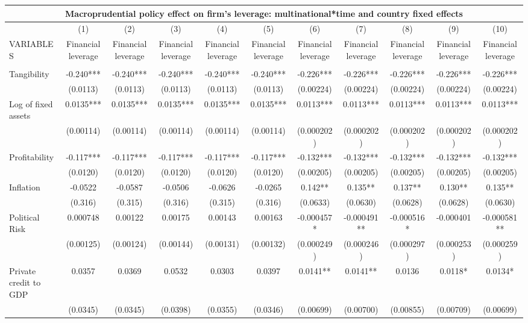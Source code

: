 \begin{tabular}{lcccccccccc}
\multicolumn{11}{c}{Macroprudential policy effect on firm's leverage: multinational*time and country fixed effects} \\ \hline
 & (1) & (2) & (3) & (4) & (5) & (6) & (7) & (8) & (9) & (10) \\
VARIABLES & Financial leverage & Financial leverage & Financial leverage & Financial leverage & Financial leverage & Financial leverage & Financial leverage & Financial leverage & Financial leverage & Financial leverage \\ \hline
 &  &  &  &  &  &  &  &  &  &  \\
Tangibility & -0.240*** & -0.240*** & -0.240*** & -0.240*** & -0.240*** & -0.226*** & -0.226*** & -0.226*** & -0.226*** & -0.226*** \\
 & (0.0113) & (0.0113) & (0.0113) & (0.0113) & (0.0113) & (0.00224) & (0.00224) & (0.00224) & (0.00224) & (0.00224) \\
Log of fixed assets & 0.0135*** & 0.0135*** & 0.0135*** & 0.0135*** & 0.0135*** & 0.0113*** & 0.0113*** & 0.0113*** & 0.0113*** & 0.0113*** \\
 & (0.00114) & (0.00114) & (0.00114) & (0.00114) & (0.00114) & (0.000202) & (0.000202) & (0.000202) & (0.000202) & (0.000202) \\
Profitability & -0.117*** & -0.117*** & -0.117*** & -0.117*** & -0.117*** & -0.132*** & -0.132*** & -0.132*** & -0.132*** & -0.132*** \\
 & (0.0120) & (0.0120) & (0.0120) & (0.0120) & (0.0120) & (0.00205) & (0.00205) & (0.00205) & (0.00205) & (0.00205) \\
Inflation & -0.0522 & -0.0587 & -0.0506 & -0.0626 & -0.0265 & 0.142** & 0.135** & 0.137** & 0.130** & 0.135** \\
 & (0.316) & (0.315) & (0.316) & (0.315) & (0.316) & (0.0633) & (0.0630) & (0.0628) & (0.0628) & (0.0630) \\
Political Risk & 0.000748 & 0.00122 & 0.00175 & 0.00143 & 0.00163 & -0.000457* & -0.000491** & -0.000516* & -0.000401 & -0.000581** \\
 & (0.00125) & (0.00124) & (0.00144) & (0.00131) & (0.00132) & (0.000249) & (0.000246) & (0.000297) & (0.000253) & (0.000259) \\
Private credit to GDP & 0.0357 & 0.0369 & 0.0532 & 0.0303 & 0.0397 & 0.0141** & 0.0141** & 0.0136 & 0.0118* & 0.0134* \\
 & (0.0345) & (0.0345) & (0.0398) & (0.0355) & (0.0346) & (0.00699) & (0.00700) & (0.00855) & (0.00709) & (0.00699) \\

\end{tabular}
